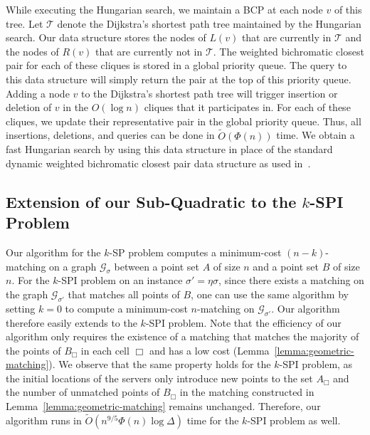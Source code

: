 \documentclass[11pt,onecolumn]{article}
\def\mcG{{\mathcal{G}}}
\newcommand{\cell}{\Box}
\newcommand{\requests}{\sigma}
\begin{document}
While executing the Hungarian search, we maintain a BCP at each node $v$ of this tree. Let $\mathcal{T}$ denote the Dijkstra's shortest path tree maintained by the Hungarian search. Our data structure stores the nodes of $L(v)$ that are currently in $\mathcal{T}$ and the nodes of $R(v)$ that are currently not in $\mathcal{T}$. The weighted bichromatic closest pair for each of these cliques is stored in a global priority queue. The query to this data structure will simply return the pair at the top of this priority queue. Adding a node $v$ to the Dijkstra's shortest path tree will trigger insertion or deletion of $v$ in the $O(\log n)$ cliques that it participates in. For each of these cliques, we update their representative pair in the global priority queue. Thus, all insertions, deletions, and queries can be done in $\tilde{O}(\Phi(n))$ time.
We obtain a fast Hungarian search by using this data structure in place of the standard dynamic weighted bichromatic closest pair data structure as used in~\cite{ra_soda12}. 

\subsection{Extension of our Sub-Quadratic to the \texorpdfstring{$k$}{-}-SPI Problem}\label{sec:kspi-extension-sub}
Our algorithm for the $k$-SP problem computes a minimum-cost $(n-k)$-matching on a graph $\mcG_\sigma$ between a point set $A$ of size $n$ and a point set $B$ of size $n$. For the $k$-SPI problem on an instance $\sigma'=\eta\sigma$, since there exists a matching on the graph $\mcG_{\requests'}$ that matches all points of $B$, one can use the same algorithm by setting $k=0$ to compute a minimum-cost $n$-matching on $\mcG_{\requests'}$. Our algorithm therefore easily extends to the $k$-SPI problem. Note that the efficiency of our algorithm only requires the existence of a matching that matches the majority of the points of $B_\cell$ in each cell $\cell$ and has a low cost (Lemma~\ref{lemma:geometric-matching}). We observe that the same property holds for the $k$-SPI problem, as the initial locations of the servers only introduce new points to the set $A_\cell$ and the number of unmatched points of $B_\cell$ in the matching constructed in Lemma~\ref{lemma:geometric-matching} remains unchanged. Therefore, our algorithm runs in $\tilde{O}(n^{9/5}\Phi(n)\log\Delta)$ time for the $k$-SPI problem as well. 
\end{document}
